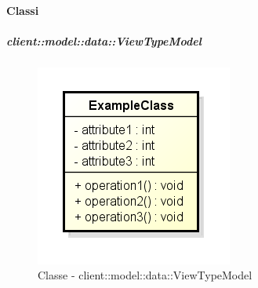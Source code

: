 	\paragraph{Classi} %
		\subparagraph{client::model::data::ViewTypeModel} %
		\label{subp:client_model_data_viewtypemodel}
			\begin{figure}[htbp]
				\centering
				\centerline{\includegraphics[scale=0.7]{./images/client/classes/example_class.png}}
				\caption{Classe - client::model::data::ViewTypeModel}
			\end{figure}
